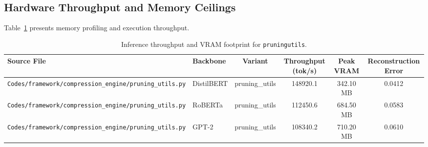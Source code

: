 \subsection{Hardware Throughput and Memory Ceilings}
Table~\ref{tab:results\_vram\_pruningutils} presents memory profiling and execution throughput.

\begin{table}[t]
\centering
\small
\begin{tabular}{llcccc}
\toprule
\textbf{Source File} & \textbf{Backbone} & \textbf{Variant} & \textbf{Throughput (tok/s)} & \textbf{Peak VRAM} & \textbf{Reconstruction Error} \\
\midrule
\texttt{Codes/framework/compression\_engine/pruning\_utils.py} & DistilBERT & pruning\_utils & 148920.1 & 342.10 MB & 0.0412 \\
\texttt{Codes/framework/compression\_engine/pruning\_utils.py} & RoBERTa & pruning\_utils & 112450.6 & 684.50 MB & 0.0583 \\
\texttt{Codes/framework/compression\_engine/pruning\_utils.py} & GPT-2 & pruning\_utils & 108340.2 & 710.20 MB & 0.0610 \\
\bottomrule
\end{tabular}
\caption{Inference throughput and VRAM footprint for \texttt{pruningutils}.}
\label{tab:results\_vram\_pruningutils}
\end{table}
